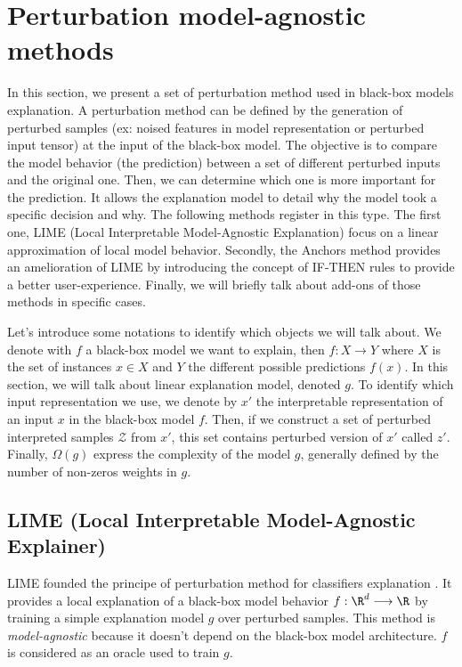\section{Perturbation model-agnostic methods}

In this section, we present a set of perturbation method used in black-box 
models explanation. A perturbation method can be defined by the 
generation of perturbed samples (ex: noised features in model representation
or perturbed input tensor) at the input of the black-box model. The objective 
is to compare the model behavior (the prediction) between a set of different 
perturbed inputs and the original one. Then, we can determine 
which one is more important for the prediction. It allows the explanation model to 
detail why the model took a specific decision and why. The following methods register in this 
type. The first one, LIME (Local Interpretable Model-Agnostic Explanation) focus on a linear approximation 
of local model behavior. Secondly, the Anchors method provides an amelioration of LIME by introducing the concept 
of IF-THEN rules to provide a better user-experience. Finally, we will briefly talk about add-ons of those methods
in specific cases. 

\begin{remark}[Notation]
    Let's introduce some notations to identify which objects we will talk about. 
    We denote with $f$ a black-box model we want to explain, then $f : X \longrightarrow Y$ 
    where $X$ is the set of instances $x \in X$ and $Y$ the different possible predictions $f(x)$. 
    In this section, we will talk about linear explanation model, denoted $g$. 
    To identify which input representation we use, we denote by $x'$ the 
    interpretable representation of an input $x$ in the black-box model $f$. 
    Then, if we construct a set of perturbed interpreted samples $ \mathcal{Z}$ 
    from $x'$, this set contains perturbed version of $x'$ called $z'$. Finally, 
    $ \Omega(g)$ express the complexity of the model $g$, generally defined by the 
    number of non-zeros weights in $g$. 
\end{remark}

\subsection{LIME (Local Interpretable Model-Agnostic Explainer)}

LIME founded the principe of perturbation method for classifiers explanation \cite{ribeiro_why_2016}. 
It provides a local explanation of a black-box model behavior 
$ f : \R^d \longrightarrow \R $ by training a simple explanation 
model $g$ over perturbed samples. This method 
is \emph{model-agnostic} because it doesn't depend on the black-box model 
architecture. $f$ is considered as an oracle used to train $g$.

